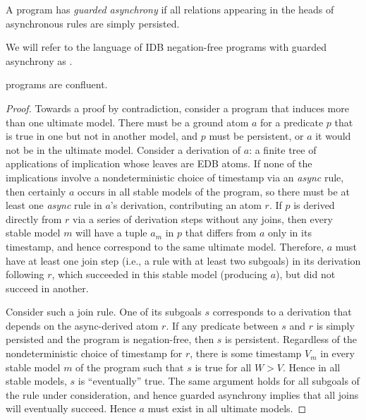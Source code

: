 \begin{definition}
A \lang program has {\em guarded asynchrony} if all relations appearing in the heads of asynchronous rules are simply persisted.
\end{definition}

We will refer to the language of IDB negation-free \lang programs with guarded asynchrony as \slang.

\begin{theorem}
\label{thm:confluence}
\slang programs are confluent.
\end{theorem}
\begin{proof}

Towards a proof by contradiction, consider a \slang program that 
induces more than one ultimate model.  There must be a ground atom $a$ for a predicate $p$
that is true in one but
not in another model, and $p$ must be persistent, or $a$ it would not be
in the ultimate model.  Consider a derivation of $a$: a finite tree of applications of
implication whose leaves are EDB atoms.  If none of the implications involve a nondeterministic
choice of timestamp via an {\em async} rule, then certainly 
$a$ occurs in all stable models of the program,
so there must be at least one {\em async} rule in $a$'s derivation, contributing an atom
$r$.  
If $p$ is derived directly from 
$r$ via a series of derivation steps without any joins, then every stable
model $m$ will have a tuple $a_m$ in $p$ that differs from $a$ only in its timestamp, 
and hence correspond to the same ultimate model.
Therefore, $a$ must have at least one join step (i.e., a rule with at least two subgoals)
in its derivation following $r$,
which succeeded in this stable model (producing $a$), but did not succeed in another.  

Consider such  a join rule.  One of its subgoals $s$ corresponds to a derivation that depends
on the async-derived atom $r$.  If any predicate between $s$ and $r$ is simply persisted and 
the program is negation-free,
then $s$ is persistent.  Regardless of the nondeterministic choice of timestamp for $r$, there
is some timestamp $V_m$ in every stable model $m$ of the program such that $s$ is true
for all $W > V$.  Hence in all stable models, $s$ is ``eventually'' true.  The same argument holds
for all subgoals of the rule under consideration, and hence guarded asynchrony implies that
all joins will eventually succeed.
Hence $a$ must exist in all ultimate models.
\end{proof}


